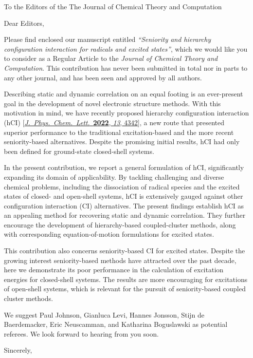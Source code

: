 \documentclass[10pt]{letter}
\begin{document}
\begin{letter}%
{To the Editors of the The Journal of Chemical Theory and Computation}

\opening{Dear Editors,}

\justifying
Please find enclosed our manuscript entitled \textit{``Seniority and hierarchy configuration interaction for radicals and excited states''}, 
which we would like you to consider as a Regular Article to the \textit{Journal of Chemical Theory and Computation}.
This contribution has never been submitted in total nor in parts to any other journal, and has been seen and approved by all authors.

Describing static and dynamic correlation on an equal footing is an ever-present goal in the development of novel electronic structure methods.
With this motivation in mind, we have recently proposed hierarchy configuration interaction (hCI)
[\href{https://doi.org/10.1021/acs.jpclett.2c00730}{\textit{J.~Phys.~Chem.~Lett.}~\textbf{2022}, \textit{13}, 4342}],
a new route that presented superior performance to the traditional excitation-based and the more recent seniority-based alternatives.
Despite the promising initial results, hCI had only been defined for ground-state closed-shell systems.

In the present contribution, we report a general formulation of hCI, significantly expanding its domain of applicability.
By tackling challenging and diverse chemical problems, including the dissociation of radical species and the excited states of closed- and open-shell systems,
hCI is extensively gauged against other configuration interaction (CI) alternatives.
The present findings establish hCI as an appealing method for recovering static and dynamic correlation.
They further encourage the development of hierarchy-based coupled-cluster methods, along with corresponding equation-of-motion formulations for excited states.

This contribution also concerns seniority-based CI for excited states.
Despite the growing interest seniority-based methods have attracted over the past decade,
here we demonstrate its poor performance in the calculation of excitation energies for closed-shell systems.
The results are more encouraging for excitations of open-shell systems,
which is relevant for the pursuit of seniority-based coupled cluster methods.

We suggest Paul Johnson, Gianluca Levi, Hannes Jonsson, Stijn de Baerdemacker, Eric Neuscamman, and Katharina Boguslawski as potential referees.
We look forward to hearing from you soon.

\closing{Sincerely,}


\end{letter}
\end{document}

